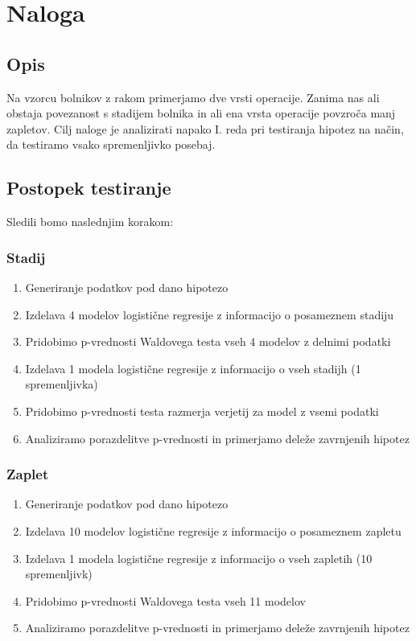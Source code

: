\documentclass[letterpaper,11pt]{article}
\begin{document}
\section{Naloga}
\subsection{Opis}
Na vzorcu bolnikov z rakom primerjamo dve vrsti operacije. Zanima nas ali obstaja povezanost s stadijem bolnika in ali ena vrsta operacije povzroča manj zapletov. Cilj naloge je analizirati napako I. reda pri testiranja hipotez na način, da testiramo vsako spremenljivko posebaj. 

\subsection{Postopek testiranje}
Sledili bomo naslednjim korakom:

\subsubsection{Stadij}
\begin{enumerate}
  \item Generiranje podatkov pod dano hipotezo
  \item Izdelava 4 modelov logistične regresije z informacijo o posameznem stadiju
  \item Pridobimo p-vrednosti Waldovega testa vseh 4 modelov z delnimi podatki
  \item Izdelava 1 modela logistične regresije z informacijo o vseh stadijh (1 spremenljivka)
  \item Pridobimo p-vrednosti testa razmerja verjetij za model z vsemi podatki
  \item Analiziramo porazdelitve p-vrednosti in primerjamo deleže zavrnjenih hipotez
\end{enumerate}

\subsubsection{Zaplet}
\begin{enumerate}
  \item Generiranje podatkov pod dano hipotezo
  \item Izdelava 10 modelov logistične regresije z informacijo o posameznem zapletu
  \item Izdelava 1 modela logistične regresije z informacijo o vseh zapletih (10 spremenljivk)
  \item Pridobimo p-vrednosti Waldovega testa vseh 11 modelov
  \item Analiziramo porazdelitve p-vrednosti in primerjamo deleže zavrnjenih hipotez
\end{enumerate}
\end{document}
